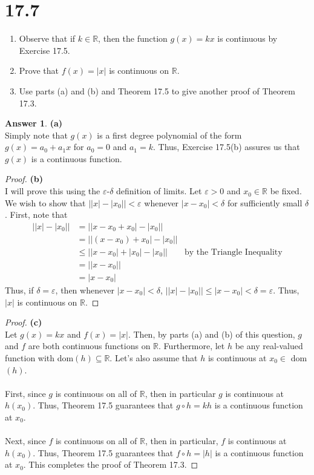 \documentclass[10pt,a4paper]{article}
\theoremstyle{definition}
\newtheorem*{answer*}{Answer}
\begin{document}
\section*{17.7}
\begin{enumerate}[label = (\alph*)]
\item Observe that if $k \in \mathbb{R}$, then the function $g(x) = kx$ is continuous by Exercise 17.5.
\item Prove that $f(x) = |x|$ is continuous on $\mathbb{R}$.
\item Use parts (a) and (b) and Theorem 17.5 to give another proof of Theorem 17.3.
\end{enumerate}

\begin{answer*}{\textbf{(a)}}
\\Simply note that $g(x)$ is a first degree polynomial of the form $g(x) = a_0 + a_1x$ for $a_0 = 0$ and $a_1 = k$. Thus, Exercise 17.5(b) assures us that $g(x)$ is a continuous function. 
\end{answer*}

\begin{proof}{\textbf{(b)}}
\\I will prove this using the $\varepsilon$-$\delta$ definition of limits. Let $\varepsilon > 0$ and $x_0 \in \mathbb{R}$ be fixed. We wish to show that $\big||x| - |x_0|\big| < \varepsilon$ whenever $|x - x_0| < \delta$ for sufficiently small $\delta$. First, note that 
\begin{align*}
\big||x| - |x_0|\big| &= \big||x - x_0 + x_0| - |x_0|\big|\\
&= \big||(x - x_0) + x_0| - |x_0|\big|\\
&\leq \big||x - x_0| + |x_0| - |x_0|\big| &\text{by the Triangle Inequality}\\
&= \big||x-x_0|\big|\\
&= |x - x_0|
\end{align*}
Thus, if $\delta = \varepsilon$, then whenever $|x - x_0| < \delta$, $\big||x| - |x_0|\big| \leq |x - x_0| < \delta = \varepsilon$. Thus, $|x|$ is continuous on $\mathbb{R}$.
\end{proof}

\begin{proof}{\textbf{(c)}}
\\Let $g(x) = kx$ and $f(x) = |x|$. Then, by parts (a) and (b) of this question, $g$ and $f$ are both continuous functions on $\mathbb{R}$. Furthermore, let $h$ be any real-valued function with dom$(h) \subseteq \mathbb{R}$. Let's also assume that $h$ is continuous at $x_0 \in $ dom$(h)$.
\\
\\First, since $g$ is continuous on all of $\mathbb{R}$, then in particular $g$ is continuous at $h(x_0)$. Thus, Theorem 17.5 guarantees that $g \circ h = k h$ is a continuous function at $x_0$. 
\\
\\Next, since $f$ is continuous on all of $\mathbb{R}$, then in particular, $f$ is continuous at $h(x_0)$. Thus, Theorem 17.5 guarantees that $f \circ h = |h|$ is a continuous function at $x_0$. This completes the proof of Theorem 17.3.
\end{proof}
\end{document}
